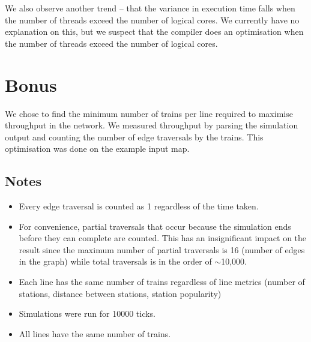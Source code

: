 \documentclass[a4paper,12pt]{article}
\begin{document}
We also observe another trend -- that the variance in execution time falls when the number of threads exceed the number of logical cores. We currently have no explanation on this, but we suspect that the compiler does an optimisation when the number of threads exceed the number of logical cores.


\section{Bonus}

We chose to find the minimum number of trains per line required to maximise throughput in the network. We measured throughput by parsing the simulation output and counting the number of edge traversals by the trains. This optimisation was done on the example input map.

\subsection{Notes}
\begin{itemize}
	\item Every edge traversal is counted as 1 regardless of the time taken.
	\item For convenience, partial traversals that occur because the simulation ends before they can complete are counted. This has an insignificant impact on the result since the maximum number of partial traversals is 16 (number of edges in the graph) while total traversals is in the order of $\sim$10,000.
	\item Each line has the same number of trains regardless of line metrics (number of stations, distance between stations, station popularity)
	\item Simulations were run for 10000 ticks.
	\item All lines have the same number of trains.
\end{itemize}
\end{document}
